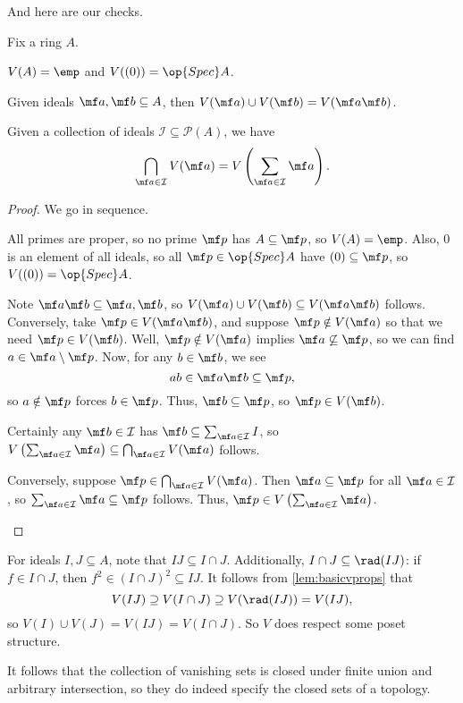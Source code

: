 \documentclass[../notes.tex]{subfiles}
\begin{document}
And here are our checks.
\begin{lemma} \label{lem:zariskitopcheck}
	Fix a ring $A$.
	\begin{listalph}
		\item $V(A)=\emp$ and $V((0))=\op{Spec}A$.
		\item Given ideals $\mf a,\mf b\subseteq A$, then $V(\mf a)\cup V(\mf b)=V(\mf a\mf b)$.
		\item Given a collection of ideals $\mathcal I\subseteq\mathcal P(A)$, we have
		\[\bigcap_{\mf a\in\mathcal I}V(\mf a)=V\left(\sum_{\mf a\in\mathcal I}\mf a\right).\]
	\end{listalph}
\end{lemma}
\begin{proof}
	We go in sequence.
	\begin{listalph}
		\item All primes are proper, so no prime $\mf p$ has $A\subseteq\mf p$, so $V(A)=\emp$. Also, $0$ is an element of all ideals, so all $\mf p\in\op{Spec}A$ have $(0)\subseteq\mf p$, so $V((0))=\op{Spec}A$.
		\item Note $\mf a\mf b\subseteq\mf a,\mf b$, so $V(\mf a)\cup V(\mf b)\subseteq V(\mf a\mf b)$ follows. Conversely, take $\mf p\in V(\mf a\mf b)$, and suppose $\mf p\notin V(\mf a)$ so that we need $\mf p\in V(\mf b)$. Well, $\mf p\notin V(\mf a)$ implies $\mf a\not\subseteq\mf p$, so we can find $a\in\mf a\setminus\mf p$. Now, for any $b\in\mf b$, we see
		\[ab\in\mf a\mf b\subseteq\mf p,\]
		so $a\notin\mf p$ forces $b\in\mf p$. Thus, $\mf b\subseteq\mf p$, so $\mf p\in V(\mf b)$.
		\item Certainly any $\mf b\in\mathcal I$ has $\mf b\subseteq\sum_{\mf a\in\mathcal I}I$, so $V\left(\sum_{\mf a\in\mathcal I}\mf a\right)\subseteq\bigcap_{\mf a\in\mathcal I}V(\mf a)$ follows.
		
		Conversely, suppose $\mf p\in\bigcap_{\mf a\in\mathcal I}V(\mf a)$. Then $\mf a\subseteq\mf p$ for all $\mf a\in\mathcal I$, so $\sum_{\mf a\in\mathcal I}\mf a\subseteq\mf p$ follows. Thus, $\mf p\in V\left(\sum_{\mf a\in\mathcal I}\mf a\right)$.
		\qedhere
	\end{listalph}
\end{proof}
\begin{remark}
	For ideals $I,J\subseteq A$, note that $IJ\subseteq I\cap J$. Additionally, $I\cap J\subseteq\rad(IJ)$: if $f\in I\cap J$, then $f^2\in(I\cap J)^2\subseteq IJ$. It follows from \autoref{lem:basicvprops} that
	\[V(IJ)\supseteq V(I\cap J)\supseteq V(\rad(IJ))=V(IJ),\]
	so $V(I)\cup V(J)=V(IJ)=V(I\cap J)$. So $V$ does respect some poset structure.
\end{remark}
It follows that the collection of vanishing sets is closed under finite union and arbitrary intersection, so they do indeed specify the closed sets of a topology.
\end{document}
